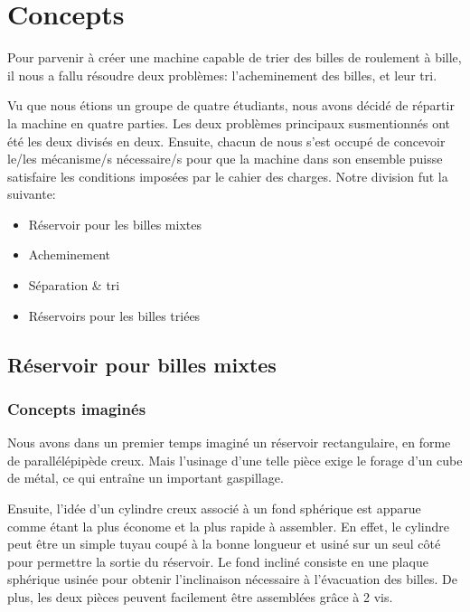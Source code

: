 \chapter{Concepts}
Pour parvenir à créer une machine capable de trier des billes de roulement à bille, il nous a fallu résoudre deux problèmes: l'acheminement des billes, et leur tri.


Vu que nous étions un groupe de quatre étudiants, nous avons décidé de répartir la machine en quatre parties. Les deux problèmes principaux susmentionnés ont été les deux divisés en deux. Ensuite, chacun de nous s'est occupé de concevoir le/les mécanisme/s nécessaire/s pour que la machine dans son ensemble puisse satisfaire les conditions imposées par le cahier des charges. Notre division fut la suivante:
\begin{itemize}
    \item Réservoir pour les billes mixtes
    \item Acheminement
    \item Séparation \& tri
    \item Réservoirs pour les billes triées
\end{itemize}

\section{Réservoir pour billes mixtes}

\subsection{Concepts imaginés}
Nous avons dans un premier temps imaginé un réservoir rectangulaire, en forme de parallélépipède creux. Mais l’usinage d’une telle pièce exige le forage d’un cube de métal, ce qui entraîne un important gaspillage.

Ensuite, l’idée d’un cylindre creux associé à un fond sphérique est apparue comme étant la plus économe et la plus rapide à assembler. En effet, le cylindre peut être un simple tuyau coupé à la bonne longueur et usiné sur un seul côté pour permettre la sortie du réservoir. Le fond incliné consiste en une plaque sphérique usinée pour obtenir l'inclinaison nécessaire à l'évacuation des billes. De plus, les deux pièces peuvent facilement être assemblées grâce à 2 vis.


